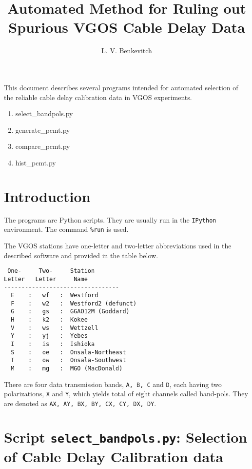 \documentclass[preprint]{aastex}
\begin{document}
\title{Automated Method for Ruling out Spurious VGOS Cable Delay Data}

\author{L. V. Benkevitch}

This document describes several programs intended for automated selection of the reliable cable delay calibration data in VGOS experiments. 

\begin{enumerate}
  \item select\_bandpols.py
  		
  \item generate\_pcmt.py
  \item compare\_pcmt.py
  \item hist\_pcmt.py
\end{enumerate}


\section{Introduction}

The programs are Python scripts. They are usually run in the \texttt{IPython} environment. The command \texttt{\%run} is used. 

The VGOS stations have one-letter and two-letter abbreviations used in the described software and provided in the table below. 
\begin{verbatim}
 One-     Two-     Station
Letter   Letter     Name
---------------------------------
  E    :   wf   :  Westford
  F    :   w2   :  Westford2 (defunct)
  G    :   gs   :  GGAO12M (Goddard)
  H    :   k2   :  Kokee
  V    :   ws   :  Wettzell
  Y    :   yj   :  Yebes
  I    :   is   :  Ishioka
  S    :   oe   :  Onsala-Northeast
  T    :   ow   :  Onsala-Southwest
  M    :   mg   :  MGO (MacDonald)
\end{verbatim}

There are four data transmission bands, \texttt{A, B, C} and \texttt{D}, each having two polarizations, \texttt{X} and \texttt{Y}, which yields total of eight channels called band-pols. They are denoted as \texttt{AX, AY, BX, BY, CX, CY, DX, DY}. 



\section{Script \texttt{select\_bandpols.py}: Selection of Cable Delay Calibration data}
\end{document}
